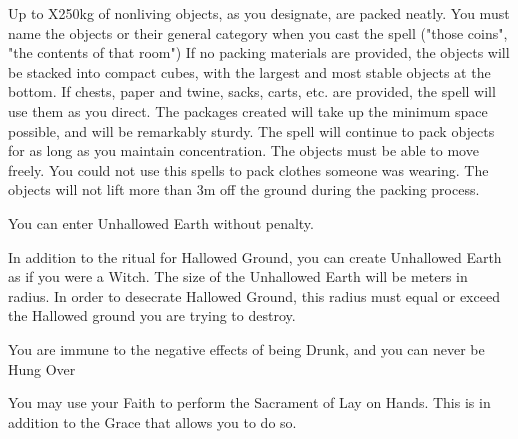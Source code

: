 {\LITURGY [
  Name= Package Neatly,
  Link=minerva-liturgy-package neatly,
  Paradigm= Entropy ,
  Save=  0 ,
  Duration= Concentration / Permanent ,
  Counter=  n/a  ,
  Keywords= None ,
  Target=   Nearby objects
]



 Up to \DICE X250kg of nonliving objects, as you designate, are packed neatly. You must name the objects or their general category when you cast the spell ("those coins", "the contents of that room") If no packing materials are provided, the objects will be stacked into compact cubes, with the largest and most stable objects at the bottom. If chests, paper and twine, sacks, carts, etc. are provided, the spell will use them as you direct. The packages created will take up the minimum space possible, and will be remarkably sturdy. The spell will continue to pack objects for as long as you maintain concentration. The objects must be able to move freely. You could not use this spells to pack clothes someone was wearing. The objects will not lift more than 3m off the ground during the packing process.





\GOD[
Name=Nimlurun,
Link=small-god-nimlurun,
GodOf=Fiend of Filth and Pollution,
Holy=an iron vial of sewer water
]


You can enter Unhallowed Earth without penalty.


In addition to the ritual for Hallowed Ground, you can create Unhallowed Earth as if you were a Witch.  The size of the Unhallowed Earth will be \DICE meters in radius.  In order to desecrate Hallowed Ground, this radius must equal or exceed the Hallowed ground you are trying to destroy.




\GOD[
Name=Ninkasi,
Link=small-god-ninkasi,
GodOf=Seraph of Art; Music; and Fermentation,
Holy=an iron amulet hung from a necklace in the exact size and shape of a modern bottle opener
]


You are immune to the negative effects of being Drunk, and you can never be Hung Over


You may use your Faith to perform the Sacrament of Lay on Hands.  This is in addition to the Grace that allows you to do so.




}
